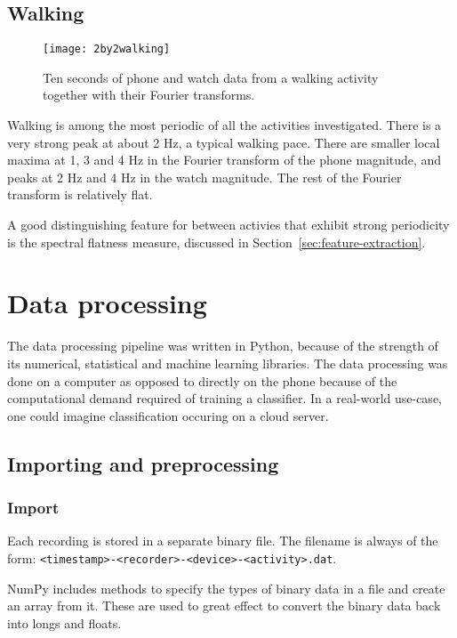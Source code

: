     \subsection{Walking}
      \begin{figure}[!th]
        \centering
        \texttt{[image: 2by2walking]}
        \caption{Ten seconds of phone and watch data from a walking activity together with their Fourier transforms.}
        \label{fig:2by2walking}
      \end{figure}
      
      Walking is among the most periodic of all the activities investigated. There is a very strong peak at about 2 Hz, a typical walking pace. There are smaller local maxima at 1, 3 and 4 Hz in the Fourier transform of the phone magnitude, and peaks at 2 Hz and 4 Hz in the watch magnitude. The rest of the Fourier transform is relatively flat.
      
      A good distinguishing feature for between activies that exhibit strong periodicity is the spectral flatness measure, discussed in Section~\ref{sec:feature-extraction}.

  \section{Data processing}
    \label{sec:data-processing}
    The data processing pipeline was written in Python, because of the strength of its numerical, statistical and machine learning libraries. The data processing was done on a computer as opposed to directly on the phone because of the computational demand required of training a classifier. In a real-world use-case, one could imagine classification occuring on a cloud server.
    \subsection{Importing and preprocessing}
      \subsubsection{Import}
        Each recording is stored in a separate binary file. The filename is always of the form: \texttt{<timestamp>-<recorder>-<device>-<activity>.dat}. 
        
        NumPy includes methods to specify the types of binary data in a file and create an array from it. These are used to great effect to convert the binary data back into longs and floats.
        

